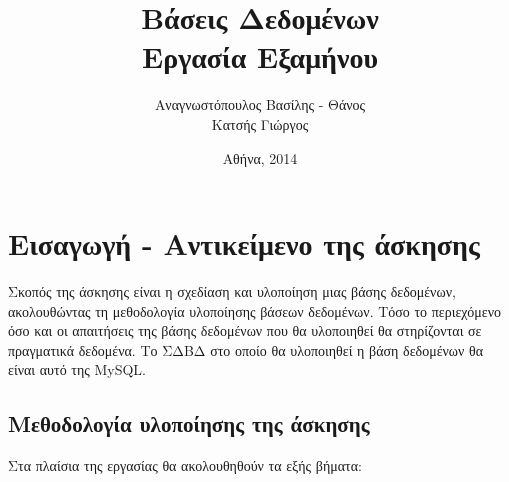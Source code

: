 \documentclass{assignment}
\title{Βάσεις Δεδομένων \\ Εργασία Εξαμήνου}
\date{Αθήνα, 2014}
\author{Αναγνωστόπουλος Βασίλης - Θάνος \\ Κατσής Γιώργος}
\begin{document}
\maketitle

\setcounter{page}{1} 

\pagestyle{plain}
\tableofcontents
\listoftables
\listoffigures
\newpage


\setcounter{page}{1} 

\section{Εισαγωγή - Αντικείμενο της άσκησης}

Σκοπός της άσκησης είναι η σχεδίαση και υλοποίηση μιας βάσης δεδομένων,
ακολουθώντας τη μεθοδολογία υλοποίησης βάσεων δεδομένων. Τόσο το περιεχόμενο όσο και οι απαιτήσεις της βάσης δεδομένων που θα
υλοποιηθεί θα στηρίζονται σε πραγματικά δεδομένα. Το ΣΔΒΔ στο οποίο θα υλοποιηθεί η βάση δεδομένων θα είναι αυτό της MySQL.

\subsection{Μεθοδολογία υλοποίησης της άσκησης}

Στα πλαίσια της εργασίας θα ακολουθηθούν τα εξής βήματα:
\end{document}
